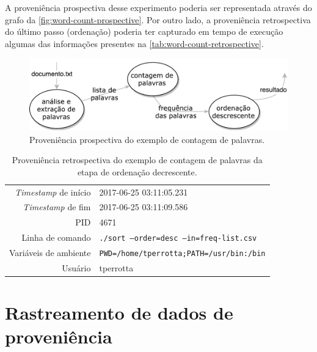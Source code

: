 A proveniência prospectiva desse experimento poderia ser representada através do grafo da \autoref{fig:word-count-prospective}. Por outro lado, a proveniência retrospectiva do último passo (ordenação) poderia ter capturado em tempo de execução algumas das informações presentes na \autoref{tab:word-count-retrospective}.

\begin{figure}[ht]
    \centering
    \includegraphics[width=\textwidth]{img/word-count-prospective}
    \caption[Proveniência prospectiva do exemplo de contagem de palavras]{Proveniência prospectiva do exemplo de contagem de palavras.}%
    \label{fig:word-count-prospective}
\end{figure}

\begin{table}[ht]
    \centering
    \begin{tabular}{r|l}
        \hline
        \textit{Timestamp} de início & 2017-06-25 03:11:05.231                         \\
        \textit{Timestamp} de fim    & 2017-06-25 03:11:09.586                         \\
        PID                          & 4671                                            \\
        Linha de comando             & \texttt{./sort --order=desc --in=freq-list.csv} \\
        Variáveis de ambiente        & \texttt{PWD=/home/tperrotta;PATH=/usr/bin:/bin} \\
        Usuário                      & tperrotta                                       \\
        \hline
    \end{tabular}
    \caption[Proveniência retrospectiva do exemplo de contagem de palavras]{Proveniência retrospectiva do exemplo de contagem de palavras da etapa de ordenação decrescente.}%
    \label{tab:word-count-retrospective}
\end{table}

\section{Rastreamento de dados de proveniência}


